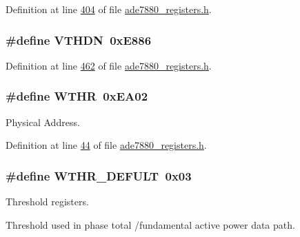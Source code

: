 Definition at line \hyperlink{a00036_source_l00404}{404} of file \hyperlink{a00036_source}{ade7880\-\_\-registers.\-h}.

\hypertarget{a00036_af4bad23826b54772e2de561c5cff3fa6}{
\subsubsection[{V\-T\-H\-D\-N}]{\setlength{\rightskip}{0pt plus 5cm}\#define V\-T\-H\-D\-N~0x\-E886}}\label{de/d8c/a00036_af4bad23826b54772e2de561c5cff3fa6}


Definition at line \hyperlink{a00036_source_l00462}{462} of file \hyperlink{a00036_source}{ade7880\-\_\-registers.\-h}.

\hypertarget{a00036_a60f6494fba59e1f242240d12202f4746}{
\subsubsection[{W\-T\-H\-R}]{\setlength{\rightskip}{0pt plus 5cm}\#define W\-T\-H\-R~0x\-E\-A02}}\label{de/d8c/a00036_a60f6494fba59e1f242240d12202f4746}


Physical Address. 



Definition at line \hyperlink{a00036_source_l00044}{44} of file \hyperlink{a00036_source}{ade7880\-\_\-registers.\-h}.

\hypertarget{a00036_a54a78cc890aa0300e82a9de239ebc5a5}{
\subsubsection[{W\-T\-H\-R\-\_\-\-D\-E\-F\-U\-L\-T}]{\setlength{\rightskip}{0pt plus 5cm}\#define W\-T\-H\-R\-\_\-\-D\-E\-F\-U\-L\-T~0x03}}\label{de/d8c/a00036_a54a78cc890aa0300e82a9de239ebc5a5}


Threshold registers. 

Threshold used in phase total /fundamental active power data path. 

